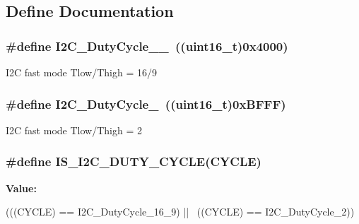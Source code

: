 \subsection{Define Documentation}
\hypertarget{group__I2C__duty__cycle__in__fast__mode_ga2b4ff186808a8095fc2d1b8193f30ce1}{
\subsubsection[{I2C\_\-DutyCycle\_\-16\_\-9}]{\setlength{\rightskip}{0pt plus 5cm}\#define I2C\_\-DutyCycle\_\_~((uint16\_\-t)0x4000)}}
\label{group__I2C__duty__cycle__in__fast__mode_ga2b4ff186808a8095fc2d1b8193f30ce1}
I2C fast mode Tlow/Thigh = 16/9 \hypertarget{group__I2C__duty__cycle__in__fast__mode_gafe0af31970aceef0fa8df6a10bef35db}{
\subsubsection[{I2C\_\-DutyCycle\_\-2}]{\setlength{\rightskip}{0pt plus 5cm}\#define I2C\_\-DutyCycle\_~((uint16\_\-t)0xBFFF)}}
\label{group__I2C__duty__cycle__in__fast__mode_gafe0af31970aceef0fa8df6a10bef35db}
I2C fast mode Tlow/Thigh = 2 \hypertarget{group__I2C__duty__cycle__in__fast__mode_gae9b3276d9b6ec872ee4fafa2b2fafb83}{
\subsubsection[{IS\_\-I2C\_\-DUTY\_\-CYCLE}]{\setlength{\rightskip}{0pt plus 5cm}\#define IS\_\-I2C\_\-DUTY\_\-CYCLE(CYCLE)}}
\label{group__I2C__duty__cycle__in__fast__mode_gae9b3276d9b6ec872ee4fafa2b2fafb83}
{\bfseries Value:}
\begin{DoxyCode}
(((CYCLE) == I2C_DutyCycle_16_9) || \
                                  ((CYCLE) == I2C_DutyCycle_2))
\end{DoxyCode}
